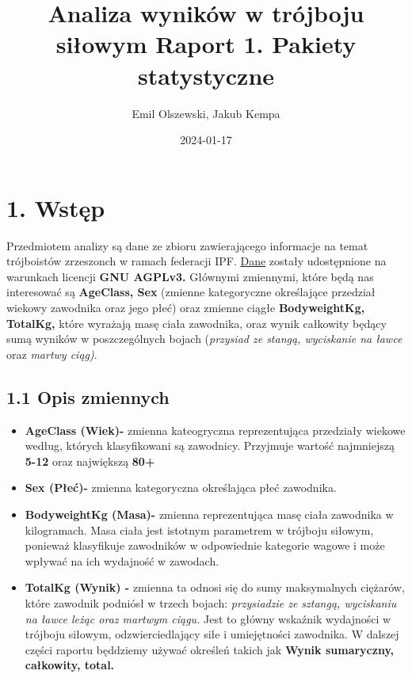 \documentclass[
  letterpaper,
  DIV=11,
  numbers=noendperiod]{scrartcl}
\title{Analiza wyników w trójboju siłowym Raport 1. Pakiety
statystyczne}
\author{Emil Olszewski, Jakub Kempa}
\date{2024-01-17}
\begin{document}
\maketitle
{}

\ifdefined\Shaded\renewenvironment{Shaded}{\begin{tcolorbox}[sharp corners, boxrule=0pt, frame hidden, interior hidden, enhanced, borderline west={3pt}{0pt}{shadecolor}, breakable]}{\end{tcolorbox}}\fi

\hypertarget{wstux119p}{%
\section{1. Wstęp}\label{wstux119p}}

Przedmiotem analizy są dane ze zbioru zawierającego informacje na temat
trójboistów zrzeszonch w ramach federacji IPF.
\href{https://gitlab.com/openpowerlifting/opl-data}{Dane} zostały
udostępnione na warunkach licencji \textbf{GNU AGPLv3.} Głównymi
zmiennymi, które będą nas interesować są \textbf{AgeClass, Sex} (zmienne
kategoryczne określające przedział wiekowy zawodnika oraz jego płeć)
oraz zmienne ciągłe \textbf{BodyweightKg, TotalKg,} które wyrażają masę
ciała zawodnika, oraz wynik całkowity będący sumą wyników w
poszczególnych bojach (\emph{przysiad ze stangą, wyciskanie na ławce}
oraz \emph{martwy ciąg)}.

\hypertarget{opis-zmiennych}{%
\subsection{1.1 Opis zmiennych}\label{opis-zmiennych}}

\begin{itemize}
\item
  \textbf{AgeClass (Wiek)-} zmienna kateogryczna reprezentująca
  przedziały wiekowe według, których klasyfikowani są zawodnicy.
  Przyjmuje wartość najmniejszą \textbf{5-12} oraz największą
  \textbf{80+}
\item
  \textbf{Sex (Płeć)-} zmienna kategoryczna określająca płeć zawodnika.
\item
  \textbf{BodyweightKg (Masa)-} zmienna reprezentująca masę ciała
  zawodnika w kilogramach. Masa ciała jest istotnym parametrem w
  trójboju siłowym, ponieważ klasyfikuje zawodników w odpowiednie
  kategorie wagowe i może wpływać na ich wydajność w zawodach.
\item
  \textbf{TotalKg (Wynik) -} zmienna ta odnosi się do sumy maksymalnych
  ciężarów, które zawodnik podniósł w trzech bojach: \emph{przysiadzie
  ze sztangą, wyciskaniu na ławce leżąc oraz martwym ciągu.} Jest to
  główny wskaźnik wydajności w trójboju siłowym, odzwierciedlający siłe
  i umiejętności zawodnika. W dalszej części raportu będdziemy używać
  określeń takich jak \textbf{Wynik sumaryczny, całkowity, total.}
\end{itemize}
\end{document}

